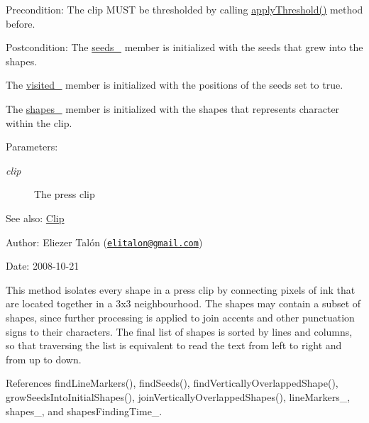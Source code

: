 \begin{Desc}
\item[Precondition:]The clip MUST be thresholded by calling \hyperlink{class_segmenter_6854315e3320f9d9a8ece14cbb8570ee}{applyThreshold()} method before.\end{Desc}
\begin{Desc}
\item[Postcondition:]The \hyperlink{class_segmenter_7859d050250b9fdf7c96374f80008d6e}{seeds\_\-} member is initialized with the seeds that grew into the shapes. 

The \hyperlink{class_segmenter_fe4dd18749f268aae2b26a1abff6a607}{visited\_\-} member is initialized with the positions of the seeds set to true. 

The \hyperlink{class_segmenter_41b94ede2829063e0937dc150756e77e}{shapes\_\-} member is initialized with the shapes that represents character within the clip.\end{Desc}
\begin{Desc}
\item[Parameters:]
\begin{description}
\item[{\em clip}]The press clip\end{description}
\end{Desc}
\begin{Desc}
\item[See also:]\hyperlink{class_clip}{Clip}\end{Desc}
\begin{Desc}
\item[Author:]Eliezer Talón (\href{mailto:elitalon@gmail.com}{\tt elitalon@gmail.com}) \end{Desc}
\begin{Desc}
\item[Date:]2008-10-21\end{Desc}
This method isolates every shape in a press clip by connecting pixels of ink that are located together in a 3x3 neighbourhood. The shapes may contain a subset of shapes, since further processing is applied to join accents and other punctuation signs to their characters. The final list of shapes is sorted by lines and columns, so that traversing the list is equivalent to read the text from left to right and from up to down. 

References findLineMarkers(), findSeeds(), findVerticallyOverlappedShape(), growSeedsIntoInitialShapes(), joinVerticallyOverlappedShapes(), lineMarkers\_\-, shapes\_\-, and shapesFindingTime\_\-.

